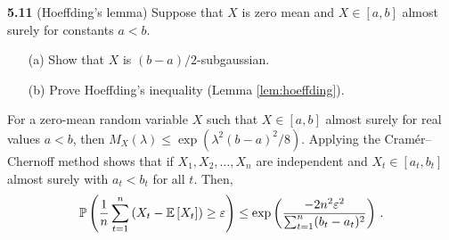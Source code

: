 \noindent\textbf{5.11} (Hoeffding's lemma) Suppose that $X$ is zero mean and $X \in [a,b]$ almost surely for constants $a <b$.
\begin{enumerate}
	\item[(a)]Show that $X$ is $(b-a)/2$-subgaussian.
	\item[(b)]Prove Hoeffding's inequality (Lemma \ref{lem:hoeffding}).
\end{enumerate}
\begin{lemma}\label{lem:hoeffding}
	For a zero-mean random variable $X$ such that $X \in [a,b]$ almost surely for real values $a <b$, then $M_X(\lambda) \le \exp(\lambda^2 (b-a)^2 / 8)$. Applying the Cramér–Chernoff method shows that if $X_1,X_2,\ldots,X_n$ are independent and $X_t \in [a_t,b_t]$ almost surely with $a_t < b_t$ for all $t$. Then, 
	\begin{align}
		\mathbb{P} \left(\frac{1}{n} \sum_{t=1}^n \left(X_t - \mathbb{E} \left[X_t\right]\right) \ge \varepsilon \right) \le \exp\left( \frac{-2n^2\varepsilon^2}{\sum_{t=1}^n (b_t-a_t)^2 } \right)\,.
	\end{align}
\end{lemma}


